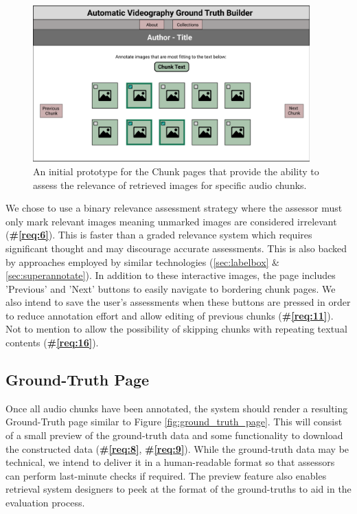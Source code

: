 \documentclass{l4proj}
\begin{document}
\begin{figure}
    \centering
    \includegraphics[width=0.95\textwidth]{figures/chunk_page.pdf}
    \caption{An initial prototype for the Chunk pages that provide the ability to assess the relevance of retrieved images for specific audio chunks.}
    \label{fig:chunk_page}
\end{figure}

We chose to use a binary relevance assessment strategy where the assessor must only mark relevant images meaning unmarked images are considered irrelevant (\textbf{\#\ref{req:6}}). This is faster than a graded relevance system which requires significant thought and may discourage accurate assessments. This is also backed by approaches employed by similar technologies (\ref{sec:labelbox} \& \ref{sec:superannotate}). In addition to these interactive images, the page includes 'Previous' and 'Next' buttons to easily navigate to bordering chunk pages. We also intend to save the user's assessments when these buttons are pressed in order to reduce annotation effort and allow editing of previous chunks (\textbf{\#\ref{req:11}}). Not to mention to allow the possibility of skipping chunks with repeating textual contents (\textbf{\#\ref{req:16}}).

\subsection{Ground-Truth Page}
Once all audio chunks have been annotated, the system should render a resulting Ground-Truth page similar to Figure \ref{fig:ground_truth_page}. This will consist of a small preview of the ground-truth data and some functionality to download the constructed data (\textbf{\#\ref{req:8}}, \textbf{\#\ref{req:9}}). While the ground-truth data may be technical, we intend to deliver it in a human-readable format so that assessors can perform last-minute checks if required. The preview feature also enables retrieval system designers to peek at the format of the ground-truths to aid in the evaluation process.
\end{document}
